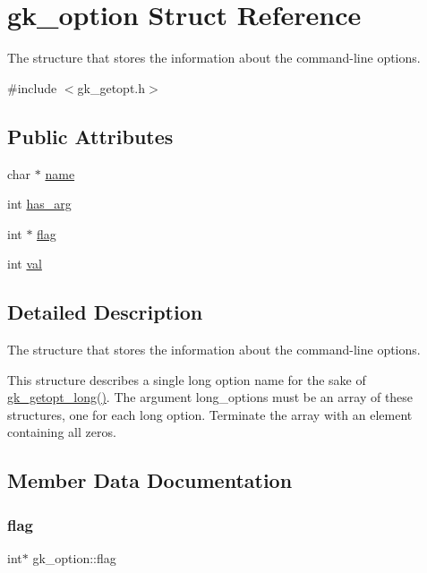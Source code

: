 \hypertarget{a00630}{}\section{gk\+\_\+option Struct Reference}
\label{a00630}


The structure that stores the information about the command-\/line options.  




{\ttfamily \#include $<$gk\+\_\+getopt.\+h$>$}

\subsection*{Public Attributes}
\begin{DoxyCompactItemize}
\item 
char $\ast$ \hyperlink{a00630_aa47d0e4e90d3cd1793fc5344b1e99afc}{name}
\item 
int \hyperlink{a00630_a66d2ab88446836cef777d756098151f5}{has\+\_\+arg}
\item 
int $\ast$ \hyperlink{a00630_ae9e56a3e65a631de45dd019a07c621b4}{flag}
\item 
int \hyperlink{a00630_abf964c7489d269515ec8e5e62b2164ba}{val}
\end{DoxyCompactItemize}


\subsection{Detailed Description}
The structure that stores the information about the command-\/line options. 

This structure describes a single long option name for the sake of \hyperlink{a00038_a1c3b8d80bd9620dc66f24d4854c0f6d3}{gk\+\_\+getopt\+\_\+long()}. The argument {\ttfamily long\+\_\+options} must be an array of these structures, one for each long option. Terminate the array with an element containing all zeros. 

\subsection{Member Data Documentation}
\mbox{\label{a00630_ae9e56a3e65a631de45dd019a07c621b4}} 
\subsubsection{\texorpdfstring{flag}{flag}}
{\footnotesize\ttfamily int$\ast$ gk\+\_\+option\+::flag}

